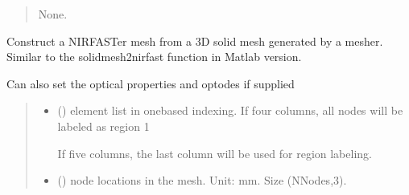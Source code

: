 \documentclass[letterpaper,10pt,english]{sphinxmanual}
\begin{document}
\begin{fulllineitems}
\begin{fulllineitems}
\begin{quote}
\begin{description}
\begin{itemize}
\end{itemize}

\sphinxAtStartPar
None.

\end{description}\end{quote}

\end{fulllineitems}


\begin{fulllineitems}
\label{\detokenize{_autosummary/nirfasterff.base.stnd_mesh.stndmesh:nirfasterff.base.stnd_mesh.stndmesh.from_solid}}
\pysigstartsignatures
\pysiglinewithargsret
{}
{\sphinxparamcomma {}\sphinxparamcomma {}\sphinxparamcomma {}\sphinxparamcomma {}\sphinxparamcomma {}}
{}
\pysigstopsignatures
\sphinxAtStartPar
Construct a NIRFASTer mesh from a 3D solid mesh generated by a mesher. Similar to the solidmesh2nirfast function in Matlab version.

\sphinxAtStartPar
Can also set the optical properties and optodes if supplied
\begin{quote}\begin{description}
\begin{itemize}
\item {} 
\sphinxAtStartPar
{} () \textendash{} 
\sphinxAtStartPar
element list in one\sphinxhyphen{}based indexing. If four columns, all nodes will be labeled as region 1

\sphinxAtStartPar
If five columns, the last column will be used for region labeling.


\item {} 
\sphinxAtStartPar
{} () \textendash{} node locations in the mesh. Unit: mm. Size (NNodes,3).


\end{itemize}
\end{description}
\end{quote}
\end{fulllineitems}
\end{fulllineitems}
\end{document}
